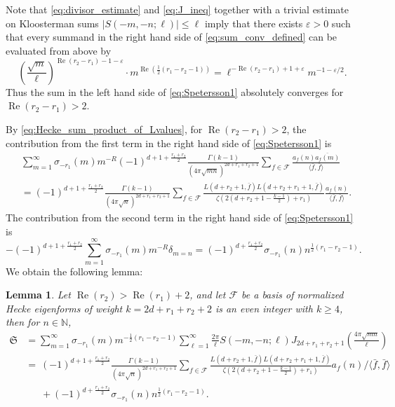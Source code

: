 \documentclass[]{article}
\newtheorem{lemma}[thm]{Lemma}
\renewcommand{\Re}{\operatorname{Re}}
\newcommand{\mathcalSsumdef}{\mathfrak{S}}
\begin{document}
Note that \eqref{eq:divisor_estimate} and \eqref{eq:J_ineq} together with a trivial estimate on Kloosterman sums $|S(-m,-n;\ell)| \le \ell$  imply that there exists $\varepsilon>0$ such that every summand in the right hand side of \eqref{eq:sum_conv_defined} can be evaluated from above by
\begin{equation}\label{eq:convergence_discussion_absdlslskdkflk}    (\frac{\sqrt{m}}{\ell})^{ \Re (r_2-r_1)-1-\varepsilon} \cdot m^{ \Re(   \frac{1}{2} (r_1-r_2-1)) } = \ell^{-\Re(r_2-r_1)+1+\varepsilon} m^{-1 - \varepsilon/2}.\end{equation}
Thus the sum in the left hand side of \eqref{eq:Spetersson1} absolutely converges for $\Re(r_2-r_1) > 2$.


By \eqref{eq:Hecke_sum_product_of_Lvalues}, for $\Re(r_2-r_1) > 2$, the contribution from the first term in the right hand side of  \eqref{eq:Spetersson1} is
\begin{equation}
\begin{split}\label{eq:Sterm1}
&  \sum_{m=1}^\infty  \sigma_{-r_1}(m)   m^{-R} (-1)^{d+1+\tfrac{r_1+r_2}{2}} \frac{\Gamma(k-1)}{ (4 \pi \sqrt{mn})^{2d+r_1+r_2+1} } \sum_{f \in \mathcal{F}} \frac{a_f(n)  \overline{a_f(m)} }{\langle \bar f, \bar f \rangle}    \\
  & = (-1)^{d+1+\tfrac{r_1+r_2}{2}} \frac{\Gamma(k-1)}{ (4 \pi \sqrt{n})^{2d+r_1+r_2+1}} \sum_{f \in \mathcal{F}}  \frac{L( d+r_2+1,\bar f ) L( d+r_2+r_1+1,\bar f ) }{\zeta(2 ( d+r_2+1 - \frac{k-1}{2}  ) + r_1 )} \frac{a_f(n)}{\langle \bar f, \bar f \rangle}.
\end{split} 
\end{equation}
The contribution from the second term  in the right hand side of  \eqref{eq:Spetersson1} is
\begin{equation}
 - (-1)^{d + 1 + \frac{r_1+r_2}{2}}   \sum_{m=1}^\infty \sigma_{-r_1}(m) m^{-R}  \delta_{m=n} =    (-1)^{d  + \frac{r_1+r_2}{2}}  \sigma_{-r_1}(n) n^{\frac{1}{2} (r_1-r_2-1) }.
\end{equation}
We obtain the following lemma:
\begin{lemma}\label{lem:side1}
Let $\Re(r_2)>\Re(r_1)+2$, 
 and let $ \mathcal{F}$ be a basis of normalized Hecke eigenforms of weight  $k = 2d+r_1+r_2+2$ is an even integer with $k \ge 4$, then for $n \in \mathbb{N}$,
\begin{align}\mathcalSsumdef&=  \sum_{m=1}^\infty \sigma_{-r_1}(m) m^{-\frac{1}{2} (r_1-r_2-1)}  \sum_{\ell=1}^\infty \frac{2 \pi }{\ell} S(-m,-n; \ell)  J_{2d+r_1+r_2+1} ( \tfrac{4 \pi \sqrt{mn}}{\ell})\nonumber\\ & =   \ (-1)^{d+1+\tfrac{r_1+r_2}{2}} \frac{\Gamma(k-1)}{ (4 \pi \sqrt{n})^{2d+r_1+r_2+1}} \sum_{f \in \mathcal{F}}  \frac{L( d+r_2+1,\bar f ) L( d+r_2+r_1+1,\bar f ) }{\zeta(2 ( d+r_2+1 - \frac{k-1}{2}  ) + r_1 )} a_f(n) / \langle \bar f, \bar f \rangle  \nonumber \\ & \ \ \ \ \ \ \  +   (-1)^{d  + \frac{r_1+r_2}{2}}  \sigma_{-r_1}(n) n^{\frac{1}{2} (r_1-r_2-1) } .\end{align}    
\end{lemma}
\end{document}
